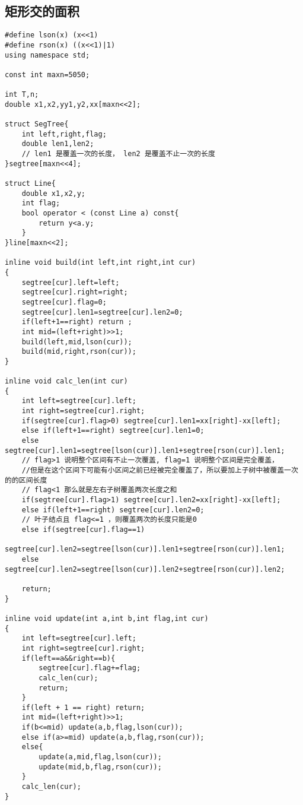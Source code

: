 \subsection{矩形交的面积}
\begin{lstlisting}
#define lson(x) (x<<1)
#define rson(x) ((x<<1)|1)
using namespace std;

const int maxn=5050;

int T,n;
double x1,x2,yy1,y2,xx[maxn<<2];

struct SegTree{
    int left,right,flag;
    double len1,len2;
    // len1 是覆盖一次的长度， len2 是覆盖不止一次的长度
}segtree[maxn<<4];

struct Line{
    double x1,x2,y;
    int flag;
    bool operator < (const Line a) const{
        return y<a.y;
    }
}line[maxn<<2];

inline void build(int left,int right,int cur)
{
    segtree[cur].left=left;
    segtree[cur].right=right;
    segtree[cur].flag=0;
    segtree[cur].len1=segtree[cur].len2=0;
    if(left+1==right) return ;
    int mid=(left+right)>>1;
    build(left,mid,lson(cur));
    build(mid,right,rson(cur));
}

inline void calc_len(int cur)
{
    int left=segtree[cur].left;
    int right=segtree[cur].right;
    if(segtree[cur].flag>0) segtree[cur].len1=xx[right]-xx[left];
    else if(left+1==right) segtree[cur].len1=0;
    else segtree[cur].len1=segtree[lson(cur)].len1+segtree[rson(cur)].len1;
    // flag>1 说明整个区间有不止一次覆盖, flag=1 说明整个区间是完全覆盖，
    //但是在这个区间下可能有小区间之前已经被完全覆盖了，所以要加上子树中被覆盖一次的的区间长度
    // flag<1 那么就是左右子树覆盖两次长度之和
    if(segtree[cur].flag>1) segtree[cur].len2=xx[right]-xx[left];
    else if(left+1==right) segtree[cur].len2=0;
    // 叶子结点且 flag<=1 ，则覆盖两次的长度只能是0
    else if(segtree[cur].flag==1)
        segtree[cur].len2=segtree[lson(cur)].len1+segtree[rson(cur)].len1;
    else segtree[cur].len2=segtree[lson(cur)].len2+segtree[rson(cur)].len2;

    return;
}

inline void update(int a,int b,int flag,int cur)
{
    int left=segtree[cur].left;
    int right=segtree[cur].right;
    if(left==a&&right==b){
        segtree[cur].flag+=flag;
        calc_len(cur);
        return;
    }
    if(left + 1 == right) return;
    int mid=(left+right)>>1;
    if(b<=mid) update(a,b,flag,lson(cur));
    else if(a>=mid) update(a,b,flag,rson(cur));
    else{
        update(a,mid,flag,lson(cur));
        update(mid,b,flag,rson(cur));
    }
    calc_len(cur);
}


\end{lstlisting}
